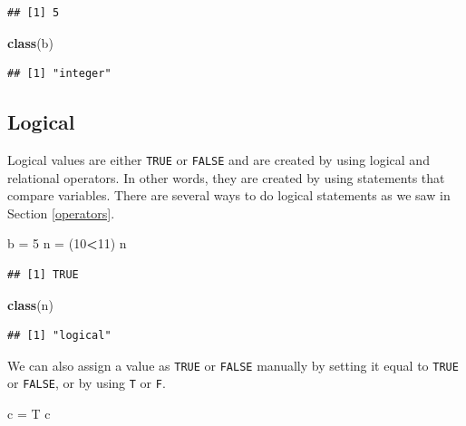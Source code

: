 \documentclass[
]{book}
\newenvironment{Shaded}{\begin{snugshade}}{\end{snugshade}}
\newcommand{\DecValTok}[1]{\textcolor[rgb]{0.00,0.00,0.81}{#1}}
\newcommand{\KeywordTok}[1]{\textcolor[rgb]{0.13,0.29,0.53}{\textbf{#1}}}
\newcommand{\NormalTok}[1]{#1}
\newcommand{\OperatorTok}[1]{\textcolor[rgb]{0.81,0.36,0.00}{\textbf{#1}}}
\newcommand{\StringTok}[1]{\textcolor[rgb]{0.31,0.60,0.02}{#1}}
\begin{document}
\begin{verbatim}
## [1] 5
\end{verbatim}

\begin{Shaded}
\begin{Highlighting}[]
\KeywordTok{class}\NormalTok{(b)}
\end{Highlighting}
\end{Shaded}

\begin{verbatim}
## [1] "integer"
\end{verbatim}

\hypertarget{logical}{%
\subsection*{Logical}\label{logical}}

Logical values are either \texttt{TRUE} or \texttt{FALSE} and are created by using logical and relational operators. In other words, they are created by using statements that compare variables. There are several ways to do logical statements as we saw in Section \ref{operators}.

\begin{Shaded}
\begin{Highlighting}[]
\NormalTok{b =}\StringTok{ }\DecValTok{5}
\NormalTok{n =}\StringTok{ }\NormalTok{(}\DecValTok{10}\OperatorTok{<}\DecValTok{11}\NormalTok{)}
\NormalTok{n}
\end{Highlighting}
\end{Shaded}

\begin{verbatim}
## [1] TRUE
\end{verbatim}

\begin{Shaded}
\begin{Highlighting}[]
\KeywordTok{class}\NormalTok{(n)}
\end{Highlighting}
\end{Shaded}

\begin{verbatim}
## [1] "logical"
\end{verbatim}

We can also assign a value as \texttt{TRUE} or \texttt{FALSE} manually by setting it equal to \texttt{TRUE} or \texttt{FALSE}, or by using \texttt{T} or \texttt{F}.

\begin{Shaded}
\begin{Highlighting}[]
\NormalTok{c =}\StringTok{ }\NormalTok{T}
\NormalTok{c}
\end{Highlighting}
\end{Shaded}
\end{document}
